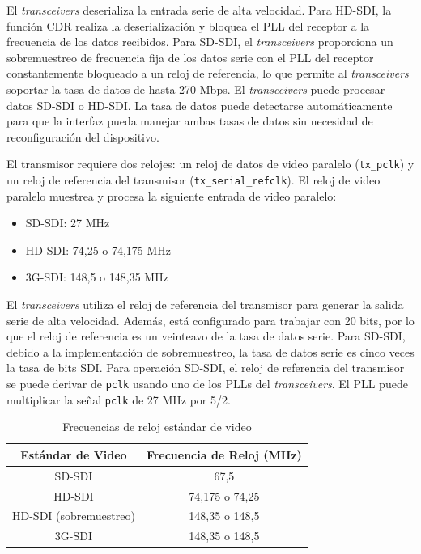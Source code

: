   El \textit{transceivers} deserializa la entrada serie de alta velocidad. Para
  HD-SDI, la función CDR realiza la deserialización y bloquea el PLL del receptor
  a la frecuencia de los datos recibidos. Para SD-SDI, el \textit{transceivers}
  proporciona un sobremuestreo de frecuencia fija de los datos serie con el PLL
  del receptor constantemente bloqueado a un reloj de referencia, lo que permite
  al \textit{transceivers} soportar la tasa de datos de hasta 270 Mbps.
  El \textit{transceivers} puede procesar datos SD-SDI o HD-SDI\@. La tasa de datos
  puede detectarse automáticamente para que la interfaz pueda manejar ambas tasas
  de datos sin necesidad de reconfiguración del dispositivo.

  El transmisor requiere dos relojes: un reloj de datos de video paralelo (\texttt{tx\_pclk})
  y un reloj de referencia del transmisor (\texttt{tx\_serial\_refclk}). El reloj
  de video paralelo muestrea y procesa la siguiente entrada de video paralelo:
  \begin{itemize}
      \item SD-SDI\@: 27 MHz
      \item HD-SDI\@: 74,25 o 74,175 MHz
      \item 3G-SDI\@: 148,5 o 148,35 MHz
  \end{itemize}

  El \textit{transceivers} utiliza el reloj de referencia del transmisor para
  generar la salida serie de alta velocidad. Además, está configurado para
  trabajar con 20 bits, por lo que el reloj de referencia es un veinteavo de la
  tasa de datos serie. Para SD-SDI, debido a la implementación de sobremuestreo,
  la tasa de datos serie es cinco veces la tasa de bits SDI\@.
  Para operación SD-SDI, el reloj de referencia del transmisor se puede derivar
  de \texttt{pclk} usando uno de los PLLs del \textit{transceivers}. El PLL puede
  multiplicar la señal \texttt{pclk} de 27 MHz por 5/2.


  \begin{table}[h]
    \caption{Frecuencias de reloj estándar de video}
    \centering
    \begin{tabular}{|c|c|}
      \toprule
      \textbf{Estándar de Video}  & \textbf{Frecuencia de Reloj (MHz)} \\
      \midrule
      SD-SDI                      & 67,5 \\
      HD-SDI                      & 74,175 o 74,25 \\
      HD-SDI (sobremuestreo)      & 148,35 o 148,5 \\
      3G-SDI                      & 148,35 o 148,5 \\
      \bottomrule
    \end{tabular}
  \end{table}

